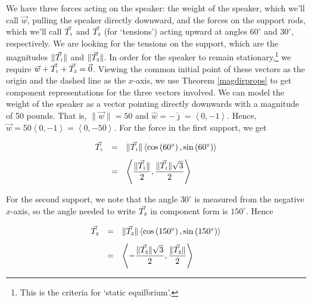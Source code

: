 \begin{ex}
\begin{center}
\begin{tabular}{cc}
\\

\end{tabular}

\end{center} 
 We have three forces acting on the speaker:  the weight of the speaker, which we'll call  $\vec{w}$, pulling the speaker directly downward, and the forces on the support rods, which we'll call $\vec{T_{\text{\tiny $1$}}}$ and $\vec{T_{\text{\tiny $2$}}}$ (for `tensions') acting upward at angles $60^{\circ}$ and $30^{\circ}$, respectively.  We are looking for the tensions on the support, which are the magnitudes  $\| \vec{T_{\text{\tiny $1$}}} \|$  and  $\| \vec{T_{\text{\tiny $2$}}} \|$.   In order for the speaker to remain stationary,\footnote{This is the criteria for `static equilbrium'.} we require  $\vec{w} + \vec{T_{\text{\tiny $1$}}} + \vec{T_{\text{\tiny $2$}}} = \vec{0}$.  Viewing the common initial point of these vectors as the origin and the dashed line as the $x$-axis, we use Theorem \ref{magdirprops} to get component representations for the three vectors involved. We can model the weight of the speaker as a vector pointing directly downwards with a magnitude of 50 pounds.  That is,  $\| \vec{w} \| = 50$ and $\hat{w} = -\hat{\jmath} = \left<0,-1\right>$.  Hence, $\vec{w} = 50\left<0,-1\right> = \left<0,-50\right>$.  For the force in the first support, we get
 
\[ \begin{array}{rcl}

 \vec{T_{\text{\tiny $1$}}} &  = &  \| \vec{T_{\text{\tiny $1$}}} \|\left<\cos\left(60^{\circ}\right), \sin\left(60^{\circ}\right)\right> \\ [8pt]
                            & =  & \left< \dfrac{\| \vec{T_{\text{\tiny $1$}}} \|}{2} , \dfrac{\| \vec{T_{\text{\tiny $1$}}} \|\sqrt{3}}{2}\right> \\ \end{array} \]
                            
For the second support, we note that the angle $30^{\circ}$ is measured from the negative $x$-axis, so the angle needed to write $\vec{T_{\text{\tiny $2$}}}$ in component form is $150^{\circ}$.  Hence

\[ \begin{array}{rcl}

\vec{T_{\text{\tiny $2$}}} & = & \| \vec{T_{\text{\tiny $2$}}} \|\left<\cos\left(150^{\circ}\right), \sin\left(150^{\circ}\right)\right>\\ [8pt]
                           & =  & \left<-\dfrac{\| \vec{T_{\text{\tiny $2$}}} \|\sqrt{3}}{2}, \dfrac{\| \vec{T_{\text{\tiny $2$}}} \|}{2} \right> \\ \end{array} \]
                           

\end{ex}

